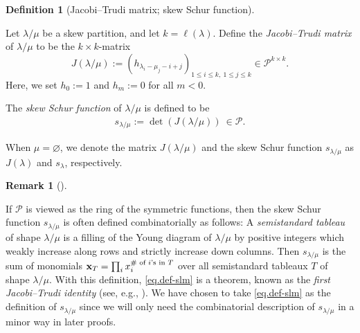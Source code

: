 \documentclass[numbers=enddot,12pt,final,onecolumn,notitlepage]{scrartcl}%
\theoremstyle{definition}
\newtheorem{defi}[theo]{Definition}
\newenvironment{definition}[1][]
{\begin{defi}[#1]\begin{leftbar}}
{\end{leftbar}\end{defi}}
\newtheorem{remk}[theo]{Remark}
\newenvironment{remark}[1][]
{\begin{remk}[#1]\begin{leftbar}}
{\end{leftbar}\end{remk}}
\let\prodnonlimits\prod
\renewcommand{\prod}{\prodnonlimits\limits}
\newcommand{\tup}[1]{\left( #1 \right)}
\renewcommand{\leq}{\leqslant}
\theoremstyle{plainsl}
\begin{document}
\begin{definition}[Jacobi--Trudi matrix; skew Schur function]
\label{Jacobi--Trudi Identity}
Let $\lambda / \mu$ be a skew partition, and let $k = \ell\tup{\lambda}$.
Define the \emph{Jacobi--Trudi matrix} of $\lambda/\mu$ to be the $k \times k$-matrix
\[
J(\lambda/\mu) := \tup{ h_{\lambda_i-\mu_j - i + j} }_{1\leq i\leq k,\ 1\leq j\leq k}
\in \mathcal{P}^{k\times k} .
\]
Here, we set $h_0 := 1$ and $h_m := 0$ for all $m < 0$.

The \emph{skew Schur function} of $\lambda/\mu$ is defined to be
\begin{align}
   s_{\lambda/\mu} := \det \tup{ J(\lambda/\mu) } \  \in \mathcal{P} .
\label{eq.def-slm}
\end{align}

When $\mu = \varnothing$, we denote the matrix $J(\lambda/\mu)$ and the skew Schur function $s_{\lambda/\mu}$ as $J(\lambda)$ and $s_\lambda$, respectively.
\end{definition}


\begin{remark}
\label{flushremark}
If $\mathcal{P}$ is viewed as the ring of the symmetric functions, then the skew Schur function $s_{\lambda/\mu}$ is often defined combinatorially as follows: 
A \emph{semistandard tableau} of shape $\lambda / \mu$ is a filling of the Young diagram of $\lambda/\mu$ by positive integers which weakly increase along rows and strictly increase down columns.
Then $s_{\lambda/\mu}$ is the sum of monomials  $\mathbf{x}_T = {\prod\nolimits_{i}} \, x_i^{\text{\# of $i$'s in }T}$ over all semistandard tableaux  $T$ of shape $\lambda / \mu$.
With this definition, \eqref{eq.def-slm} is a theorem, known as the \emph{first Jacobi--Trudi identity} (see, e.g., \cite[Theorem 7.16.1]{EC2}).
We have chosen to take \eqref{eq.def-slm} as the definition of $s_{\lambda/\mu}$ since we will 
only need the combinatorial description of $s_{\lambda/\mu}$ in a minor way in later proofs.
%
\end{remark}
\end{document}
